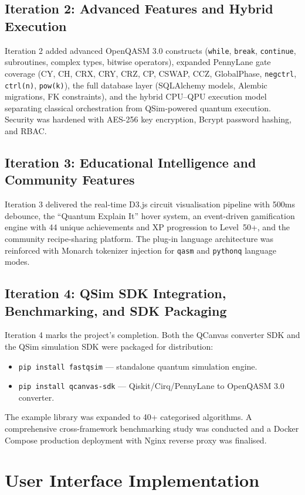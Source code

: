 \subsection{Iteration 2: Advanced Features and Hybrid Execution}
Iteration 2 added advanced OpenQASM 3.0 constructs (\texttt{while}, \texttt{break}, \texttt{continue}, subroutines, complex types, bitwise operators), expanded PennyLane gate coverage (CY, CH, CRX, CRY, CRZ, CP, CSWAP, CCZ, GlobalPhase, \texttt{negctrl}, \texttt{ctrl(n)}, \texttt{pow(k)}), the full database layer (SQLAlchemy models, Alembic migrations, FK constraints), and the hybrid CPU--QPU execution model separating classical orchestration from QSim-powered quantum execution. Security was hardened with AES-256 key encryption, Bcrypt password hashing, and RBAC.

\subsection{Iteration 3: Educational Intelligence and Community Features}
Iteration 3 delivered the real-time D3.js circuit visualisation pipeline with 500ms debounce, the ``Quantum Explain It'' hover system, an event-driven gamification engine with 44 unique achievements and XP progression to Level~50+, and the community recipe-sharing platform. The plug-in language architecture was reinforced with Monarch tokenizer injection for \texttt{qasm} and \texttt{pythonq} language modes.

\subsection{Iteration 4: QSim SDK Integration, Benchmarking, and SDK Packaging}
Iteration 4 marks the project's completion. Both the QCanvas converter SDK and the QSim simulation SDK were packaged for distribution:
\begin{itemize}
    \item \texttt{pip install fastqsim} --- standalone quantum simulation engine.
    \item \texttt{pip install qcanvas-sdk} --- Qiskit/Cirq/PennyLane to OpenQASM 3.0 converter.
\end{itemize}
The example library was expanded to 40+ categorised algorithms. A comprehensive cross-framework benchmarking study was conducted and a Docker Compose production deployment with Nginx reverse proxy was finalised.

\section{User Interface Implementation}

